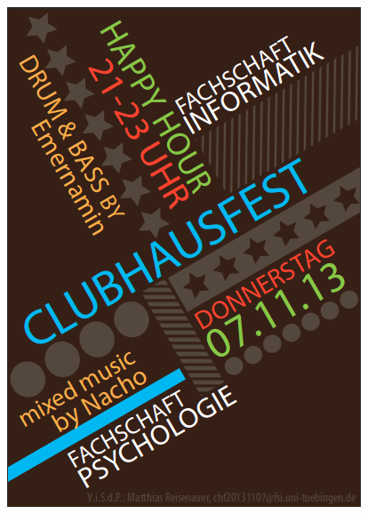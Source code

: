 \documentclass{beamer}
\begin{document}
	\begin{frame}
		\begin{center}
			\includegraphics[scale=0.45]{CHF_Flyer.png}
		\end{center}
	\end{frame}
\end{document}
